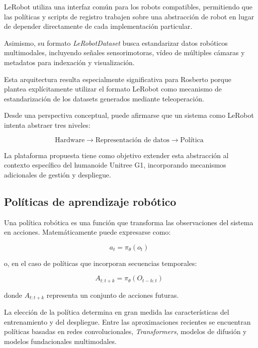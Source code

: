 \documentclass[stu,12pt,floatsintext]{apa7}
\begin{document}
LeRobot utiliza una interfaz común para los robots compatibles, permitiendo que las políticas y scripts de registro trabajen sobre una abstracción de robot en lugar de depender directamente de cada implementación particular.

Asimismo, su formato \textit{LeRobotDataset} busca estandarizar datos robóticos multimodales, incluyendo señales sensorimotoras, vídeo de múltiples cámaras y metadatos para indexación y visualización.

Esta arquitectura resulta especialmente significativa para Rosberto porque plantea explícitamente utilizar el formato LeRobot como mecanismo de estandarización de los datasets generados mediante teleoperación.

Desde una perspectiva conceptual, puede afirmarse que un sistema como LeRobot intenta abstraer tres niveles:

\begin{equation}
\text{Hardware}
\rightarrow
\text{Representación de datos}
\rightarrow
\text{Política}
\end{equation}

La plataforma propuesta tiene como objetivo extender esta abstracción al contexto específico del humanoide Unitree G1, incorporando mecanismos adicionales de gestión y despliegue.

\subsection{Políticas de aprendizaje robótico}

Una política robótica es una función que transforma las observaciones del sistema en acciones. Matemáticamente puede expresarse como:

\begin{equation}
a_t = \pi_{\theta}(o_t)
\end{equation}

o, en el caso de políticas que incorporan secuencias temporales:

\begin{equation}
A_{t:t+k} = \pi_{\theta}(O_{t-h:t})
\end{equation}

donde $A_{t:t+k}$ representa un conjunto de acciones futuras.

La elección de la política determina en gran medida las características del entrenamiento y del despliegue. Entre las aproximaciones recientes se encuentran políticas basadas en redes convolucionales, \textit{Transformers}, modelos de difusión y modelos fundacionales multimodales.
\end{document}
